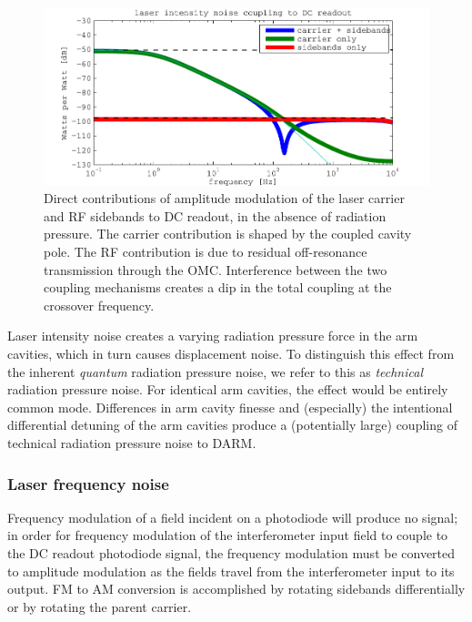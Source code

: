 \begin{figure}
\includegraphics[width=\columnwidth]{notes/figures/srcam_contributions.pdf}
\caption[Components of laser intensity noise contribution to DC readout]{\label{fig:laser-AM-contributions}Direct contributions of
  amplitude modulation of the laser carrier and RF sidebands to DC
  readout, in the absence of radiation pressure.  The carrier
  contribution is shaped by the coupled cavity pole.  The RF
  contribution is due to residual off-resonance transmission through
  the OMC.  Interference between the two coupling mechanisms creates a
  dip in the total coupling at the crossover frequency.}
\end{figure}

Laser intensity noise creates a varying radiation pressure force in the arm
cavities, which in turn causes displacement noise.  To distinguish this effect
from the inherent \emph{quantum} radiation pressure
noise\cite{Caves1980QuantumMechanical}, we refer to this as \emph{technical}
radiation pressure noise.  For identical arm cavities, the effect would be
entirely common mode.  Differences in arm cavity finesse and (especially) the
intentional differential detuning of the arm cavities produce a (potentially
large\cite{ChaibiOptomechanical}) coupling of technical radiation pressure noise
to DARM.

\subsubsection{Laser frequency noise}

Frequency modulation of a field incident on a photodiode will produce
no signal; in order for frequency modulation of the interferometer
input field to couple to the DC readout photodiode signal, the
frequency modulation must be converted to amplitude modulation as the
fields travel from the interferometer input to its output.  FM to AM
conversion is accomplished by rotating sidebands differentially or by
rotating the parent carrier.


